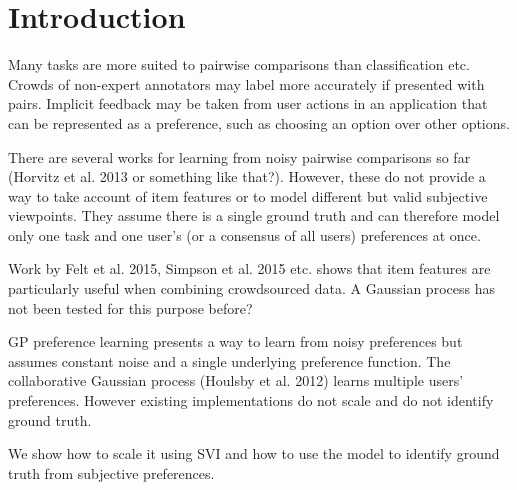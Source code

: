 \section{Introduction}\label{sec:intro}

Many tasks are more suited to pairwise comparisons than classification etc. 
Crowds of non-expert annotators may label more accurately if presented with pairs. 
Implicit feedback may be taken from user actions in an application that can be represented as a preference, such as choosing
an option over other options.

There are several works for learning from noisy pairwise comparisons so far (Horvitz et al. 2013 or something like that?). 
However, these do not provide a way to take account of item features or to model different but valid subjective viewpoints. 
They assume there is a single ground truth and can therefore model only one task and one user's (or a consensus of all users) preferences at once. 

Work by Felt et al. 2015, Simpson et al. 2015 etc. shows that item features are particularly useful when combining crowdsourced data. A Gaussian process has not been tested for this purpose before?

GP preference learning presents a way to learn from noisy preferences but assumes constant noise and a single underlying preference function. 
The collaborative Gaussian process (Houlsby et al. 2012) learns multiple users' preferences. 
However existing implementations do not scale and do not identify ground truth. 

We show how to scale it using SVI and how to use the model to identify ground truth from subjective preferences. 
